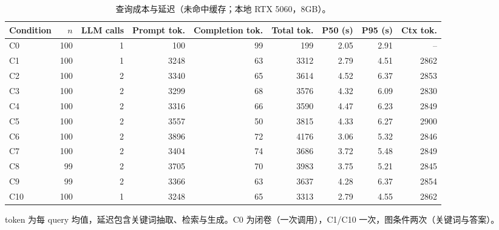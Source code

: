 \begin{table}[H]
\centering
\caption{查询成本与延迟（未命中缓存；本地 RTX 5060，8GB）。}
\label{tab:cost}
\scriptsize
\setlength{\tabcolsep}{2.8pt}
\begin{threeparttable}
\begin{tabular}{@{}l r r r r r r r r@{}}
\toprule
Condition & $n$ & LLM calls & Prompt tok. & Completion tok. & Total tok. & P50 (s) & P95 (s) & Ctx tok. \\
\midrule
C0 & 100 & 1 & 100 & 99 & 199 & 2.05 & 2.91 & -- \\
C1 & 100 & 1 & 3248 & 63 & 3312 & 2.79 & 4.51 & 2862 \\
C2 & 100 & 2 & 3340 & 65 & 3614 & 4.52 & 6.37 & 2853 \\
C3 & 100 & 2 & 3299 & 68 & 3576 & 4.32 & 6.09 & 2830 \\
C4 & 100 & 2 & 3316 & 66 & 3590 & 4.47 & 6.23 & 2849 \\
C5 & 100 & 2 & 3557 & 50 & 3815 & 4.33 & 6.27 & 2900 \\
C6 & 100 & 2 & 3896 & 72 & 4176 & 3.06 & 5.32 & 2846 \\
C7 & 100 & 2 & 3404 & 74 & 3686 & 3.72 & 5.48 & 2849 \\
C8 & 99 & 2 & 3705 & 70 & 3983 & 3.75 & 5.21 & 2845 \\
C9 & 99 & 2 & 3366 & 63 & 3637 & 4.28 & 6.37 & 2854 \\
C10 & 100 & 1 & 3248 & 65 & 3313 & 2.79 & 4.55 & 2862 \\
\bottomrule
\end{tabular}
\begin{tablenotes}\scriptsize
\item token 为每 query 均值，延迟包含关键词抽取、检索与生成。C0 为闭卷（一次调用），C1/C10 一次，图条件两次（关键词与答案）。
\end{tablenotes}
\end{threeparttable}
\end{table}
